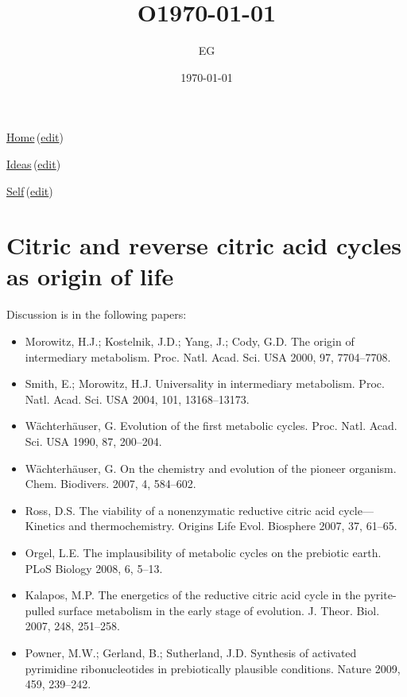 \documentclass[12pt]{paper}
\title{O\today}
\author{EG}
\date{\today}
\newcommand{\wikilink}[2] { \href{#1.pdf}{#2}\,(\href{#1.tex}{edit})}
\begin{document}
 \maketitle
\wikilink{home}{Home}

\wikilink{ideas}{Ideas}
 
\wikilink{metabolism}{Self}

\section{Citric and reverse citric acid cycles as origin of life}
Discussion is in the following papers:
\begin{itemize}
 \item 
 Morowitz, H.J.; Kostelnik, J.D.; Yang, J.; Cody, G.D. The origin of intermediary metabolism. Proc.
Natl. Acad. Sci. USA 2000, 97, 7704–7708.
\item 
 Smith, E.; Morowitz, H.J. Universality in intermediary metabolism. Proc. Natl. Acad. Sci. USA
2004, 101, 13168–13173.
\item 
 Wächterhäuser, G. Evolution of the first metabolic cycles. Proc. Natl. Acad. Sci. USA 1990,
87, 200–204.
\item 
 Wächterhäuser, G. On the chemistry and evolution of the pioneer organism. Chem. Biodivers.
2007, 4, 584–602.
\item 
 Ross, D.S. The viability of a nonenzymatic reductive citric acid cycle—Kinetics and
thermochemistry. Origins Life Evol. Biosphere 2007, 37, 61–65.
\item 
 Orgel, L.E. The implausibility of metabolic cycles on the prebiotic earth. PLoS Biology 2008, 6,
5–13.
\item 
 Kalapos, M.P. The energetics of the reductive citric acid cycle in the pyrite-pulled surface
metabolism in the early stage of evolution. J. Theor. Biol. 2007, 248, 251–258.
\item 
 Powner, M.W.; Gerland, B.; Sutherland, J.D. Synthesis of activated pyrimidine ribonucleotides in
prebiotically plausible conditions. Nature 2009, 459, 239–242.

\end{itemize}

 
\end{document}
